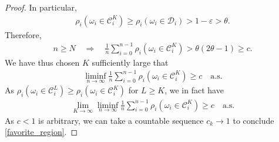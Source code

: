 \documentclass[11pt,reqno]{amsart}
\numberwithin{equation}{section}
\theoremstyle{definition}
\begin{document}
\begin{proof}
In particular, 
{\begin{align*} {
\rho_i(\omega_i \in {\mathcal{C}}_i^K) \geq \rho_i(\omega_i \in {\mathcal{D}}_i) > 1 - {\varepsilon} > \theta.
} \end{align*}}
Therefore,
{\begin{align*} {
n \geq N \quad \Rightarrow \quad \frac{1}{n} \sum_{i = 0}^{n-1} \rho_i(\omega_i \in {\mathcal{C}}_i^K) > \theta(2\theta - 1) \geq c.
} \end{align*}}
We have thus chosen $K$ sufficiently large that
{\begin{align*} {
\liminf_{n \to \infty} \frac{1}{n}  \sum_{i = 0}^{n-1} \rho_i(\omega_i \in {\mathcal{C}}_i^K) \geq c \quad \mathrm{a.s.}
} \end{align*}}
As $\rho_i(\omega_i \in {\mathcal{C}}_i^L) \geq \rho_i(\omega_i \in {\mathcal{C}}_i^{K})$ for $L \geq K$, we in fact have
{\begin{align*} {
\lim_{K \to \infty} \liminf_{n \to \infty} \frac{1}{n} \sum_{i = 0}^{n-1}\rho_i(\omega_i \in {\mathcal{C}}_i^K) \geq c \quad \mathrm{a.s.}
} \end{align*}}
As $c < 1$ is arbitrary, we can take a countable sequence $c_k \to 1$ to conclude \eqref{favorite_region}.
\end{proof}
\end{document}
